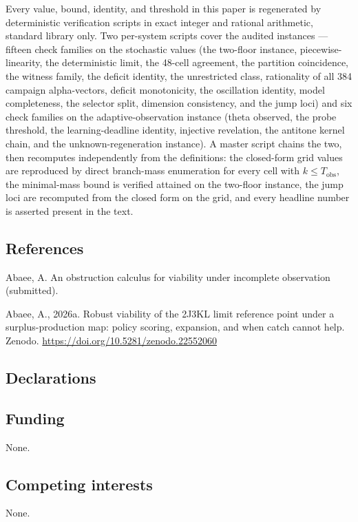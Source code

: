 \documentclass[10pt,twocolumn]{article}
\theoremstyle{plain}
\theoremstyle{definition}
\theoremstyle{remark}
\begin{document}
Every value, bound, identity, and threshold in this paper is regenerated
by deterministic verification scripts in exact integer and rational
arithmetic, standard library only. Two per-system scripts cover the
audited instances --- fifteen check families on the stochastic values
(the two-floor instance, piecewise-linearity, the deterministic limit,
the 48-cell agreement, the partition coincidence, the witness family,
the deficit identity, the unrestricted class, rationality of all 384
campaign alpha-vectors, deficit monotonicity, the oscillation identity,
model completeness, the selector split, dimension consistency, and the
jump loci) and six check families on the adaptive-observation instance
(theta observed, the probe threshold, the learning-deadline identity,
injective revelation, the antitone kernel chain, and the
unknown-regeneration instance). A master script chains the two, then
recomputes independently from the definitions: the closed-form grid
values are reproduced by direct branch-mass enumeration for every cell
with \(k \le T_{\mathrm{obs}}\), the minimal-mass bound is verified
attained on the two-floor instance, the jump loci are recomputed from
the closed form on the grid, and every headline number is asserted
present in the text.

\subsection*{References}

Abaee, A. An obstruction calculus for viability under incomplete
observation (submitted).

Abaee, A., 2026a. Robust viability of the 2J3KL limit reference point
under a surplus-production map: policy scoring, expansion, and when
catch cannot help. Zenodo.
\url{https://doi.org/10.5281/zenodo.22552060}

\subsection*{Declarations}

\subsection*{Funding}
None.

\subsection*{Competing interests}
None.
\end{document}
